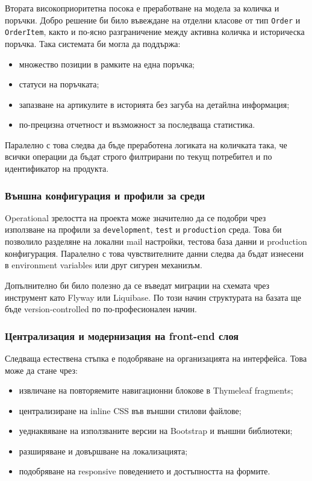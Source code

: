 Втората високоприоритетна посока е преработване на модела за количка и поръчки. Добро решение би било въвеждане на отделни класове от тип \texttt{Order} и \texttt{OrderItem}, както и по-ясно разграничение между активна количка и историческа поръчка. Така системата би могла да поддържа:

\begin{itemize}[leftmargin=*]
    \item множество позиции в рамките на една поръчка;
    \item статуси на поръчката;
    \item запазване на артикулите в историята без загуба на детайлна информация;
    \item по-прецизна отчетност и възможност за последваща статистика.
\end{itemize}

Паралелно с това следва да бъде преработена логиката на количката така, че всички операции да бъдат строго филтрирани по текущ потребител и по идентификатор на продукта.

\subsubsection{Външна конфигурация и профили за среди}

Operational зрелостта на проекта може значително да се подобри чрез използване на профили за \texttt{development}, \texttt{test} и \texttt{production} среда. Това би позволило разделяне на локални mail настройки, тестова база данни и production конфигурация. Паралелно с това чувствителните данни следва да бъдат изнесени в environment variables или друг сигурен механизъм.

Допълнително би било полезно да се въведат миграции на схемата чрез инструмент като Flyway или Liquibase. По този начин структурата на базата ще бъде version-controlled по по-професионален начин.

\subsubsection{Централизация и модернизация на front-end слоя}

Следваща естествена стъпка е подобряване на организацията на интерфейса. Това може да стане чрез:

\begin{itemize}[leftmargin=*]
    \item извличане на повторяемите навигационни блокове в Thymeleaf fragments;
    \item централизиране на inline CSS във външни стилови файлове;
    \item уеднаквяване на използваните версии на Bootstrap и външни библиотеки;
    \item разширяване и довършване на локализацията;
    \item подобряване на responsive поведението и достъпността на формите.
\end{itemize}

